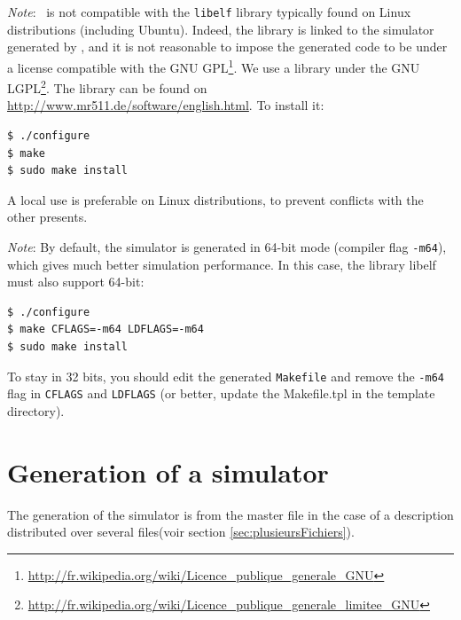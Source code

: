 \emph{Note}: \gadl\ is not compatible with the \texttt{libelf} library typically found on Linux distributions (including Ubuntu). Indeed, the library is linked to the simulator generated by \gadl, and it is not reasonable to impose the generated code to be under a license compatible with the GNU GPL\footnote{\url{http://fr.wikipedia.org/wiki/Licence\_publique\_generale\_GNU}}. We use a library under the GNU LGPL\footnote{\url{http://fr.wikipedia.org/wiki/Licence\_publique\_generale\_limitee\_GNU}}. The library can be found on \url{http://www.mr511.de/software/english.html}. To install it:
\begin{verbatim}
$ ./configure
$ make
$ sudo make install
\end{verbatim}

A local use is preferable on Linux distributions, to prevent conflicts with the other presents.

\emph{Note}: By default, the simulator is generated in 64-bit mode (compiler flag \texttt{-m64}), which gives much better simulation performance. In this case, the library libelf must also support 64-bit:
\begin{verbatim}
$ ./configure
$ make CFLAGS=-m64 LDFLAGS=-m64
$ sudo make install
\end{verbatim}

To stay in 32 bits, you should edit the generated \texttt{Makefile} and remove the \texttt{-m64} flag in \texttt{CFLAGS} and \texttt{LDFLAGS} (or better, update the Makefile.tpl in the template directory).



\section{Generation of a simulator}
The generation of the simulator is from the master file in the case of a description distributed over several files(voir section \ref{sec:plusieursFichiers}).

